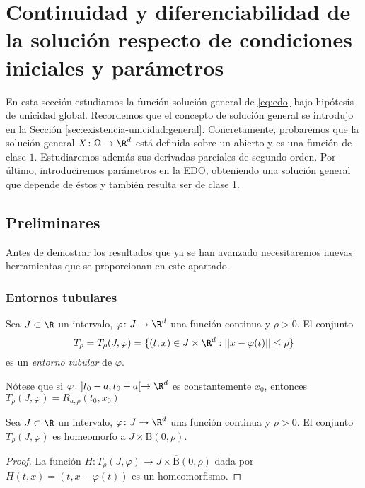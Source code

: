 
\section{Continuidad y diferenciabilidad de la solución respecto de condiciones iniciales y
  parámetros}

En esta sección estudiamos la función solución general de \eqref{eq:edo} bajo hipótesis de unicidad
global.  Recordemos que el concepto de solución general se introdujo en la Sección
\ref{sec:existencia-unicidad:general}. Concretamente, probaremos que la solución general
$X \colon \Omega \to \R^d$ está definida sobre un abierto y es una función de clase
$1$. Estudiaremos además sus derivadas parciales de segundo orden. Por último, introduciremos
parámetros en la EDO, obteniendo una solución general que depende de éstos y también resulta ser de
clase 1.

\subsection{Preliminares} \label{sec:sol-general:preliminares}

Antes de demostrar los resultados que ya se han avanzado necesitaremos nuevas herramientas que se
proporcionan en este apartado.

\subsubsection{Entornos tubulares}

\begin{definition}
  Sea $J \subset \R$ un intervalo, $\varphi \colon J \to \R^d$ una función continua y $\rho > 0$. El
  conjunto
  \[ T_{\rho} = T_{\rho}(J, \varphi) = \{(t,x) \in J \times \R^d : ||x-\varphi(t)|| \le \rho\} \] es
  un \emph{entorno tubular} de $\varphi$.
\end{definition}

Nótese que si $\varphi \colon ]t_0-a, t_0+a[ \to \R^d$ es constantemente $x_0$, entonces
$T_{\rho}(J, \varphi) = R_{a, \rho}(t_0, x_0)$

\begin{lemma}
  Sea $J \subset \R$ un intervalo, $\varphi \colon J \to \R^d$ una función continua y $\rho > 0$. El
  conjunto $T_\rho(J,\varphi)$ es homeomorfo a $J \times \overline{\mathrm{B}}(0,\rho)$.
\end{lemma}
\begin{proof}
  La función $H \colon T_{\rho}(J, \varphi)\to J \times \overline{\mathrm{B}}(0,\rho)$ dada por
  $H(t,x) = (t, x-\varphi(t))$ es un homeomorfismo.
\end{proof}

